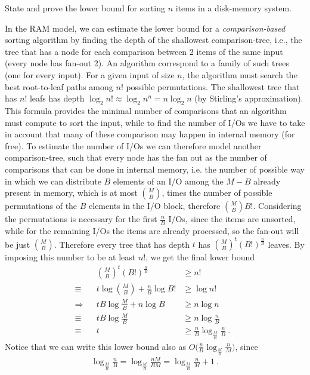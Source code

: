 \exercise

State and prove the lower bound for sorting $n$ items in a disk-memory system.

\solution

In the RAM model, we can estimate the lower bound for a \emph{comparison-based}
sorting algorithm by finding the depth of the shallowest comparison-tree, i.e.,
the tree that has a node for each comparison between 2 items of the same input
(every node has fan-out 2). An algorithm correspond to a family of such trees
(one for every input). For a given input of size $n$, the algorithm must search
the best root-to-leaf paths among $n!$ possible permutations. The shallowest
tree that has $n!$ leafs has depth $\log_2 n! \approx \log_2 n^n = n\log_2 n$
(by Stirling's approximation). This formula provides the minimal number of
comparisons that an algorithm must compute to sort the input, while to find the
number of I/Os we have to take in account that many of these comparison may
happen in internal memory (for free). To estimate the number of I/Os we can
therefore model another comparison-tree, such that every node has the fan out as
the number of comparisons that can be done in internal memory, i.e. the number
of possible way in which we can distribute $B$ elements of an I/O among the $M -
B$ already present in memory, which is at most ${M}\choose{B}$, times the number
of possible permutations of the $B$ elements in the I/O block, therefore ${M
\choose B} B!$. Considering the permutations is necessary for the first
$\frac{n}{B}$ I/Os, since the items are unsorted, while for the remaining I/Os
the items are already processed, so the fan-out will be just $M \choose B$.
Therefore every tree that has depth $t$ has ${M \choose B}^t (B!)^\frac{n}{B}$
leaves. By imposing this number to be at least $n!$, we get the final lower bound
%
\begin{align*}
  && && && && &&             && {M \choose B}^t (B!)^\frac{n}{B} &\ge n! && && && && && && && \\
  && && && && && \equiv      && t\log{{M \choose B}} + \frac{n}{B}\log{B!} &\ge \log{n!} && && && && && && && \\
  && && && && && \Rightarrow && tB\log{\frac{M}{B}} + n\log{B} &\ge n\log{n} && && && && && && && \\
  && && && && && \equiv      && tB\log{\frac{M}{B}} &\ge n\log{\frac{n}{B}} && && && && && && && \\
  && && && && && \equiv      && t &\ge \frac{n}{B}\log_{\frac{M}{B}}{\frac{n}{B}}\ . && && && && && && && 
\end{align*}
%
Notice that we can write this lower bound also as $O\big(\frac{n}{B}
\log_{\frac{M}{B}} \frac{n}{M}\big)$, since
%
\begin{align*}
  \log_{\frac{M}{B}} \frac{n}{B} =
  \log_{\frac{M}{B}} \frac{nM}{BM} = \log_{\frac{M}{B}} \frac{n}{M} + 1\ .
\end{align*}
